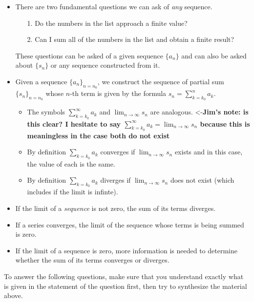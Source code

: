 \documentclass{ximera}
\begin{document}
\begin{itemize}
\item There are two fundamental questions we can ask of \emph{any} sequence.
\begin{itemize}
\item[1.] Do the numbers in the list approach a finite value?
\item[2.] Can I sum all of the numbers in the list and obtain a finite result?
\end{itemize}
These questions can be asked of a given sequence $\{a_n\}$ and can also be asked about $\{s_n\}$ or any sequence constructed from it.
\item Given a sequence $\{a_n\}_{n=n_0}$, we construct the sequence of partial sum $\{s_n\}_{n=n_0}$ whose $n$-th term is given by the formula $s_n = \sum_{k=k_0}^n a_k$.
\begin{itemize}
\item The symbols $\sum_{k=k_0}^{\infty} a_k$ and $\lim_{n \to \infty} s_n$ are analogous. <-\textbf{Jim's note: is this clear?  I hesitate to say  $\sum_{k=k_0}^{\infty} a_k = \lim_{n \to \infty} s_n$ because this is meaningless in the case both do not exist}
\item By definition $\sum_{k=k_0} a_k$ converges if $\lim_{n \to \infty} s_n$ exists and in this case, the value of each is the same.
\item By definition $\sum_{k=k_0} a_k$ diverges if $\lim_{n \to \infty} s_n$ does not exist (which includes if the limit is infinte). 
\end{itemize}
\item If the limit of a \emph{sequence} is not zero, the sum of its terms diverges.
\item If a series converges, the limit of the sequence whose terms is being summed is zero.
\item If the limit of a sequence is zero, more information is needed to determine whether the sum of its terms converges or diverges.
\end{itemize}

To answer the following questions, make sure that you understand exactly what is given in the statement of the question first, then try to synthesize the material above.
\end{document}
